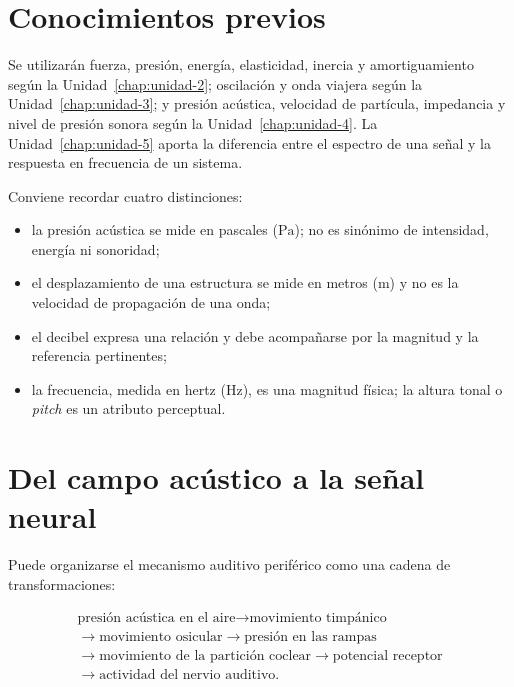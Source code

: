 \section{Conocimientos previos}
\label{sec:u6-conocimientos-previos}

Se utilizarán fuerza, presión, energía, elasticidad, inercia y amortiguamiento
según la Unidad~\ref{chap:unidad-2}; oscilación y onda viajera según la
Unidad~\ref{chap:unidad-3}; y presión acústica, velocidad de partícula,
impedancia y nivel de presión sonora según la
Unidad~\ref{chap:unidad-4}. La Unidad~\ref{chap:unidad-5} aporta la
diferencia entre el espectro de una señal y la respuesta en frecuencia de un
sistema.

Conviene recordar cuatro distinciones:

\begin{itemize}
    \item la presión acústica se mide en pascales (\(\text{Pa}\)); no es
    sinónimo de intensidad, energía ni sonoridad;
    \item el desplazamiento de una estructura se mide en metros
    (\(\text{m}\)) y no es la velocidad de propagación de una onda;
    \item el decibel expresa una relación y debe acompañarse por la magnitud y
    la referencia pertinentes;
    \item la frecuencia, medida en hertz (\(\text{Hz}\)), es una magnitud
    física; la altura tonal o \emph{pitch} es un atributo perceptual.
\end{itemize}

\section{Del campo acústico a la señal neural}
\label{sec:u6-cadena}

Puede organizarse el mecanismo auditivo periférico como una cadena de
transformaciones:

\[
\begin{gathered}
\text{presión acústica en el aire}
\longrightarrow \text{movimiento timpánico}\\
\longrightarrow \text{movimiento osicular}
\longrightarrow \text{presión en las rampas}\\
\longrightarrow \text{movimiento de la partición coclear}
\longrightarrow \text{potencial receptor}\\
\longrightarrow \text{actividad del nervio auditivo}.
\end{gathered}
\]

